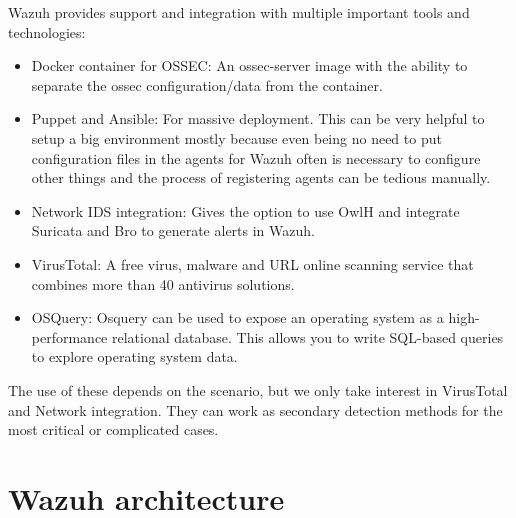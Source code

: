 \linej
\linej
Wazuh provides support and integration with multiple important tools and technologies:
\begin{itemize}
	\item Docker container for OSSEC: An ossec-server image with the ability to separate the ossec configuration/data from the container.
	\item Puppet and Ansible: For massive deployment. This can be very helpful to setup a big environment mostly because even being no need to put configuration files in the agents for Wazuh often is necessary to configure other things and the process of registering agents can be tedious manually.
	\item Network IDS integration: Gives the option to use OwlH and integrate Suricata and Bro to generate alerts in Wazuh.
	\item VirusTotal: A free virus, malware and URL online scanning service that combines more than 40 antivirus solutions.
	\item OSQuery: Osquery can be used to expose an operating system as a high-performance relational database. This allows you to write SQL-based queries to explore operating system data.
\end{itemize}
\linej
The use of these depends on the scenario, but we only take interest in VirusTotal and Network integration. They can work as secondary detection methods for the most critical or complicated cases.

\section{Wazuh architecture}

